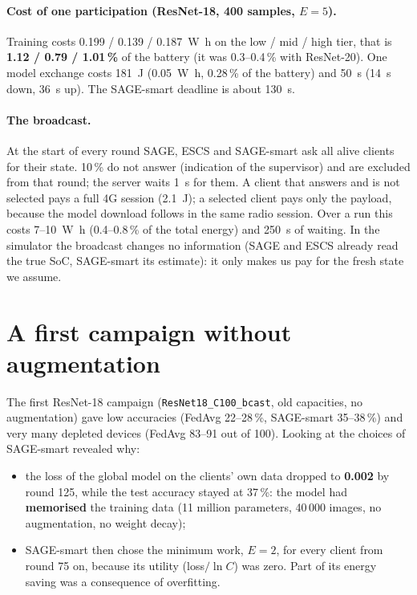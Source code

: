 \documentclass[11pt,a4paper]{article}
\begin{document}
\paragraph{Cost of one participation (ResNet-18, 400 samples, $E=5$).}
Training costs 0.199 / 0.139 / \SI{0.187}{\watt\hour} on the low / mid / high
tier, that is \textbf{1.12 / 0.79 / 1.01\,\%} of the battery (it was 0.3--0.4\,\%
with ResNet-20). One model exchange costs \SI{181}{\joule}
(\SI{0.05}{\watt\hour}, 0.28\,\% of the battery) and \SI{50}{\second}
(\SI{14}{\second} down, \SI{36}{\second} up). The SAGE-smart deadline is about
\SI{130}{\second}.

\paragraph{The broadcast.} At the start of every round SAGE, ESCS and SAGE-smart
ask all alive clients for their state. 10\,\% do not answer (indication of the
supervisor) and are excluded from that round; the server waits
\SI{1}{\second} for them. A client that answers and is not selected pays a full
4G session (\SI{2.1}{\joule}); a selected client pays only the payload, because
the model download follows in the same radio session. Over a run this costs
\SI{7}{}--\SI{10}{\watt\hour} (0.4--0.8\,\% of the total energy) and
\SI{250}{\second} of waiting. In the simulator the broadcast changes no
information (SAGE and ESCS already read the true SoC, SAGE-smart its estimate):
it only makes us pay for the fresh state we assume.

\section{A first campaign without augmentation}
\label{sec:first}

The first ResNet-18 campaign (\texttt{ResNet18\_C100\_bcast}, old capacities,
no augmentation) gave low accuracies (FedAvg 22--28\,\%, SAGE-smart 35--38\,\%)
and very many depleted devices (FedAvg 83--91 out of 100). Looking at the
choices of SAGE-smart revealed why:

\begin{itemize}
  \item the loss of the global model on the clients' own data dropped to
        \textbf{0.002} by round 125, while the test accuracy stayed at 37\,\%:
        the model had \textbf{memorised} the training data (11 million
        parameters, 40\,000 images, no augmentation, no weight decay);
  \item SAGE-smart then chose the minimum work, $E=2$, for every client from
        round 75 on, because its utility (loss$/\ln C$) was zero. Part of its
        energy saving was a consequence of overfitting.
\end{itemize}
\end{document}
